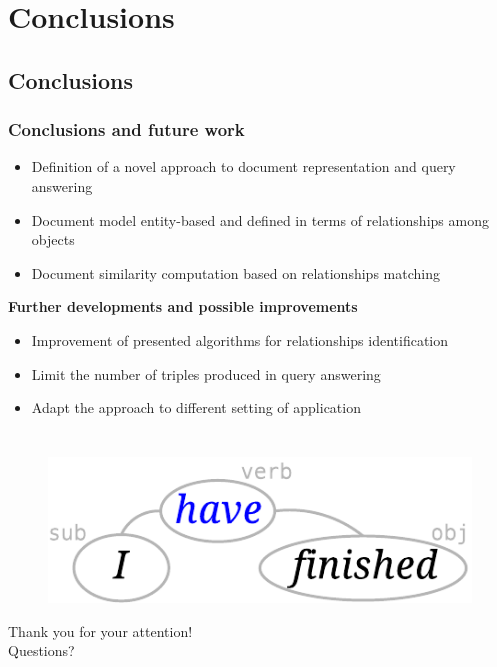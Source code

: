 \documentclass{beamer}
\begin{document}
\section{Conclusions}
\subsection{Conclusions}

\begin{frame}
\frametitle{Conclusions and future work}
\begin{itemize}
\item Definition of a novel approach to document representation and
  query answering
\item Document model entity-based and defined in terms of
  relationships among objects
\item Document similarity computation based on relationships matching
\end{itemize}
\bigskip
{\color{red}\bfseries{Further developments and possible improvements}}\\
\begin{itemize}
\item Improvement of presented algorithms for relationships
  identification
\item Limit the number of triples produced in query answering
\item Adapt the approach to different setting of application
\end{itemize}
\end{frame}

\section*{}
\begin{frame}
\begin{center}
\begin{figure}
\includegraphics[scale=0.6]{imgs/joke}
\end{figure}
\bigskip
Thank you for your attention!\\
Questions?
\end{center}
\end{frame}
\end{document}
